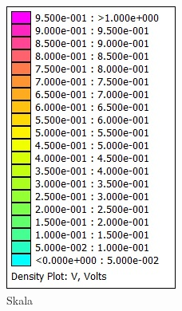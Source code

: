 \begin{figure}[h]
	\begin{subfigure}[c]{0.2\textwidth}
		\includegraphics[width=\textwidth]{data/Skala}
		\caption{Skala}
		\label{fig:Skala}
	\end{subfigure}
	\begin{subfigure}[c]{0.38\textwidth}

\end{subfigure}
\end{figure}
